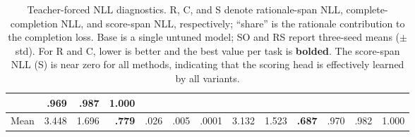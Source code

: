 \begin{table}[t]
\begin{tabular}{l rrr rrr rrr rrr}
                        & .969 & .987 & 1.000 \\
\midrule
Mean                    & 3.448 & 1.696 & \textbf{.779}
                        & .026  & .005  & .0001
                        & 3.132 & 1.523 & \textbf{.687}
                        & .970 & .982 & 1.000 \\
\bottomrule
\end{tabular}
\caption{Teacher-forced NLL diagnostics. R, C, and S denote rationale-span NLL,
complete-completion NLL, and score-span NLL, respectively; ``share'' is the
rationale contribution to the completion loss. Base is a single untuned model;
SO and RS report three-seed means ($\pm$ std). For R and C, lower is better
and the best value per task is \textbf{bolded}. The score-span NLL (S) is
near zero for all methods, indicating that the scoring head is effectively
learned by all variants.}
\label{tab:full-nll-diagnostics}
\end{table}

